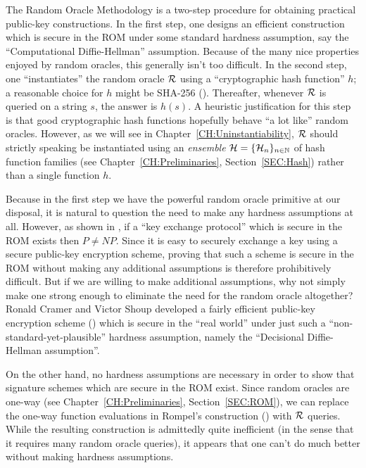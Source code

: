The Random Oracle Methodology is a two-step procedure for
obtaining practical public-key constructions.
In the first step, one designs an efficient construction which is secure in
the ROM under some standard hardness assumption, say the ``Computational
Diffie-Hellman'' assumption. Because of the many nice properties enjoyed by
random oracles, this generally isn't too difficult.  In the second step, one
``instantiates'' the random oracle $\mathcal{R}$ using a ``cryptographic hash
function'' $h$; a reasonable choice for $h$ might be SHA-256
(\cite{nist:sha1}). Thereafter, whenever $\mathcal{R}$ is queried on a string $s$,
the answer is $h(s)$. A heuristic justification for this step is that good
cryptographic hash functions hopefully behave ``a lot like'' random oracles.
However, as we will see in
Chapter~\ref{CH:Uninstantiability}, $\mathcal{R}$ should strictly speaking be
instantiated using an {\it ensemble} $\mathcal{H} = \{\mathcal{H}_n\}_{n \in \mathbb{N}}$ of hash function
families (see Chapter~\ref{CH:Preliminaries}, Section~\ref{SEC:Hash}) rather
than a single function $h$. 

Because in the first step 
we have the powerful random oracle primitive at our disposal, 
it is natural to question the need to make any hardness assumptions at all.
However, as shown in \cite{impagliazzo:nooneway}, if a ``key exchange
protocol'' which is secure in the ROM exists then $P \neq NP$. Since it is
easy to securely exchange a key using a secure public-key encryption scheme,
proving that such a scheme is secure in the ROM without making any additional
assumptions is therefore prohibitively difficult.  But if we are willing to
make additional assumptions, why not simply make one strong enough to
eliminate the need for the random oracle altogether?  Ronald Cramer and Victor
Shoup developed a fairly efficient public-key encryption scheme
(\cite{cramer:cca2secure}) which is secure in the ``real world'' under just
such a ``non-standard-yet-plausible'' hardness assumption, namely the
``Decisional Diffie-Hellman assumption''.

On the other hand, no hardness assumptions are necessary in order to show that
signature schemes which are secure in the ROM exist. Since random oracles are
one-way (see Chapter~\ref{CH:Preliminaries}, Section~\ref{SEC:ROM}), we can
replace the one-way function evaluations in Rompel's construction
(\cite{rompel:1waysigs}) with $\mathcal{R}$ queries. 
While the resulting construction is admittedly quite inefficient (in the sense
that it requires many random oracle queries), it appears that one can't do
much better without making hardness assumptions.

